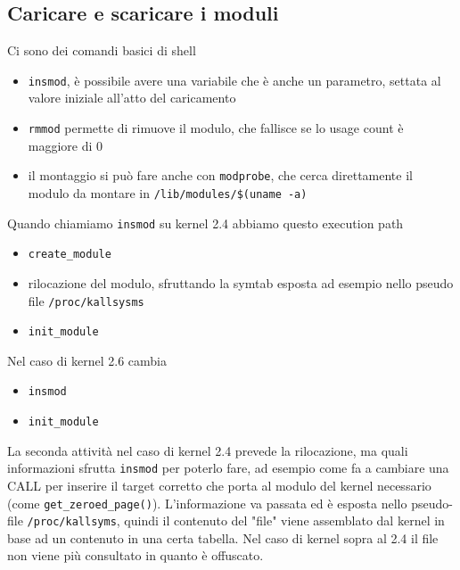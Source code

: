 \documentclass[12pt, oneside]{extbook}
\begin{document}
\subsection{Caricare e scaricare i moduli}
Ci sono dei comandi basici di shell
\begin{itemize}
\item \texttt{insmod}, è possibile avere una variabile che è anche un parametro, settata al valore iniziale all'atto del caricamento
\item \texttt{rmmod} permette di rimuove il modulo, che fallisce se lo usage count è maggiore di 0
\item il montaggio si può fare anche con \texttt{modprobe}, che cerca direttamente il modulo da montare in \texttt{/lib/modules/\$(uname -a)}
\end{itemize}
Quando chiamiamo \texttt{insmod} su kernel 2.4 abbiamo questo execution path
\begin{itemize}
\item \texttt{create\_module}
\item rilocazione del modulo, sfruttando la symtab esposta ad esempio nello pseudo file \texttt{/proc/kallsysms}
\item \texttt{init\_module}
\end{itemize}
Nel caso di kernel 2.6 cambia
\begin{itemize}
	\item \texttt{insmod}
	\item \texttt{init\_module}
\end{itemize}
La seconda attività nel caso di kernel 2.4 prevede la rilocazione, ma quali informazioni sfrutta \texttt{insmod} per poterlo fare, ad esempio come fa a cambiare una CALL per inserire il target corretto che porta al modulo del kernel necessario (come \texttt{get\_zeroed\_page()}). L'informazione va passata ed è esposta nello pseudo-file \texttt{/proc/kallsyms}, quindi il contenuto del "file" viene assemblato dal kernel in base ad un contenuto in una certa tabella. Nel caso di kernel sopra al 2.4 il file non viene più consultato in quanto è offuscato.
\end{document}
